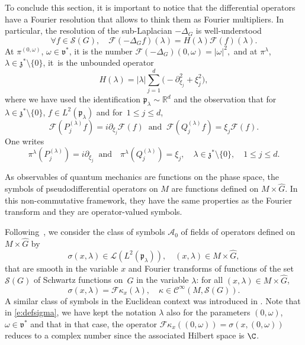 \documentclass[JEP,XML,SOM,Unicode,published]{cedram}
\let\mathcal\mathscr
\theoremstyle{plain}
\theoremstyle{definition}
\def\R{{\mathbb R}}
\begin{document}
To conclude this section, it is important to notice that the differential operators have a Fourier resolution that allows to think them as Fourier multipliers. In particular, the resolution of the sub-Laplacian $-\Delta_G$ is well-understood
\[
\forall f\in{\mathcal S}(G),\quad \mathcal F(-\Delta_G f)(\lambda)= H(\lambda) {\mathcal F} (f) (\lambda).
\]
At $\pi^{(0,\omega)}$, $\omega\in{\mathfrak v}^*$, it is the number
${\mathcal F} (-\Delta_G)(0,\omega) = |\omega|^2,$
and at $\pi^\lambda$, $\lambda\in{\mathfrak z}^*\setminus\{0\}$, it~is the unbounded operator
\begin{equation}\label{def:H}
H(\lambda)=|\lambda| \sum_{ j=1}^{d} \bigl(-\partial_{\xi_j}^2+\xi_j^2\bigr),
\end{equation}
where we have used the identification $\mathfrak p_\lambda\!\sim\! \R^d$ and the observation that for \hbox{$\lambda\!\in\!\mathfrak z^*\!\setminus\!\{0\}$}, $ f\in L^2(\mathfrak p_\lambda)$ and for~$1\leq j\leq d$,
\[
\mathcal F (P^{(\lambda)}_jf)=i\partial_{\xi_j}\mathcal F(f) \; \;\mbox{and}\; \;\mathcal F(Q^{(\lambda)}_jf)=\xi_j\mathcal F(f).
\]
One writes
\begin{equation}\label{calcul:pi(P)}
\pi^\lambda(P^{(\lambda)}_j)=i\partial_{\xi_j} \; \;\mbox{and}\quad \pi^\lambda(Q^{(\lambda)}_j)=\xi_j,\quad \lambda\in\mathfrak z^*\setminus\{0\},\quad 1\leq j\leq d.
\end{equation}

 \label{sec:semiclassic}
As observables of quantum mechanics are functions on the phase space, the symbols of pseudodifferential operators on $M$ are functions defined on $M\times \widehat{G}$. In this non-commutative framework, they have the same properties as the Fourier transform and they are operator-valued symbols.

Following~\cite{FF,FF1}, we consider the class of symbols ${{\mathcal A}_0}$ of fields of operators defined on $M\times \widehat G$ by
\[
\sigma(x,\lambda)\in{\mathcal L}(L^2(\mathfrak p_\lambda)),\quad (x,\lambda)\in M\times \widehat G,
\]
that are smooth in the variable $x$ and Fourier transforms of functions of the set~${\mathcal S}(G)$ of Schwartz functions on~$G$
in the variable $\lambda$: for all $(x,\lambda)\in M\times \widehat G$,
\begin{equation}\label{e:defsigma}
\sigma(x,\lambda) = {\mathcal F} \kappa_x (\lambda),\quad \kappa\in\mathcal C^\infty(M,\mathcal S(G)).
\end{equation}
A similar class of symbols in the Euclidean context was introduced in \cite[\S 3]{LP93}.
Note that in \eqref{e:defsigma}, we have kept the notation $\lambda$ also for the parameters $(0,\omega)$, $\omega\in\mathfrak v^*$ and that in that case, the operator ${\mathcal F} \kappa_x ((0,\omega))=\sigma(x,(0,\omega))$ reduces to a complex number since the associated Hilbert space is $\C$.
\end{document}
